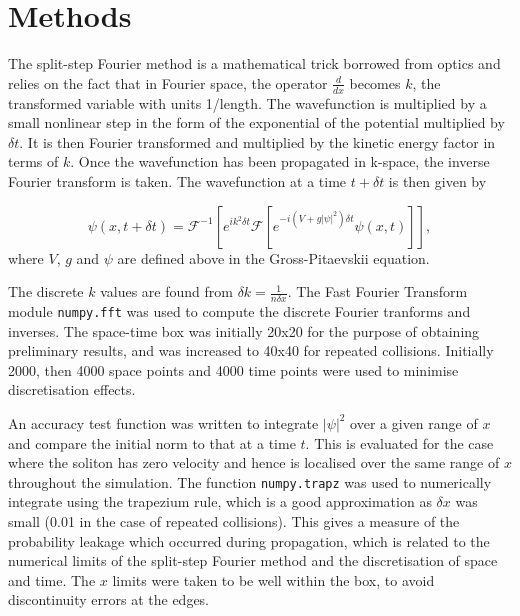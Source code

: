 \documentclass[10pt, twocolumn]{revtex4}    %
\begin{document}

\section{Methods} \label{Methods}

The split-step Fourier method is a mathematical trick borrowed from optics and relies on the fact that in Fourier space, the operator $\frac{d}{dx}$ becomes $k$, the transformed variable with units 1/length. The wavefunction is multiplied by a small nonlinear step in the form of the exponential of the potential multiplied by $\delta t$. It is then Fourier transformed and multiplied by the kinetic energy factor in terms of $k$. Once the wavefunction has been propagated in k-space, the inverse Fourier transform is taken. The wavefunction at a time $t+\delta t$ is then given by

\begin{equation} \label{fft}
\psi(x,t+\delta t) = \mathcal{F}^{-1}[e^{ik^2 \delta t} \mathcal{F} [e^{-i(V+g|\psi|^2) \delta t} \psi(x,t) ] ],
\end{equation}
where $V$, $g$ and $\psi$ are defined above in the Gross-Pitaevskii equation. 

The discrete $k$ values are found from $\delta k = \frac{1}{n \delta x}$. The Fast Fourier Transform module \texttt{numpy.fft} was used to compute the discrete Fourier tranforms and inverses. The space-time box was initially 20x20 for the purpose of obtaining preliminary results, and was increased to 40x40 for repeated collisions. Initially 2000, then 4000 space points and 4000 time points were used to minimise discretisation effects. 

An accuracy test function was written to integrate $|\psi|^2$ over a given range of $x$ and compare the initial norm to that at a time $t$. This is evaluated for the case where the soliton has zero velocity and hence is localised over the same range of $x$ throughout the simulation. The function \texttt{numpy.trapz} was used to numerically integrate using the trapezium rule, which is a good approximation as $\delta x$ was small (0.01 in the case of repeated collisions). This gives a measure of the probability leakage which occurred during propagation, which is related to the numerical limits of the split-step Fourier method and the discretisation of space and time. The $x$ limits were taken to be well within the box, to avoid discontinuity errors at the edges. 
\end{document}
